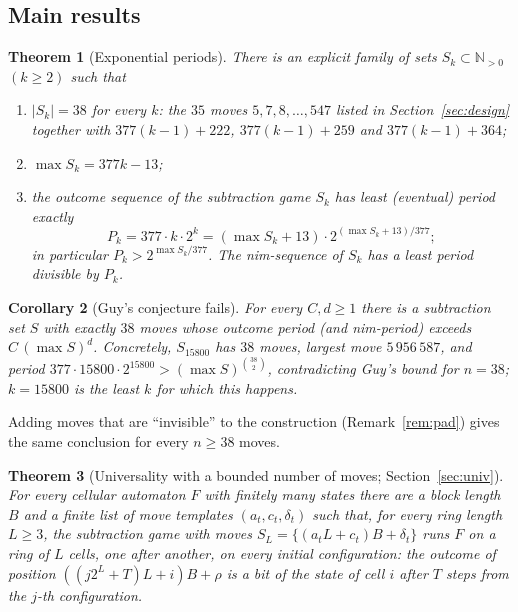\documentclass[11pt]{article}
\newtheorem{theorem}{Theorem}
\newtheorem{corollary}[theorem]{Corollary}
\theoremstyle{definition}
\newcommand{\N}{\mathbb{N}}
\newcommand{\nmoves}{38}
\begin{document}
\subsection{Main results}

\begin{theorem}[Exponential periods]\label{thm:main}
There is an explicit family of sets $S_k\subset\N_{>0}$ $(k\ge 2)$ such that
\begin{enumerate}[label=(\roman*)]
\item $|S_k|=\nmoves$ for every $k$: the $35$ moves $5,7,8,\dots,547$ listed in Section~\ref{sec:design}
together with $377(k-1)+222$, $377(k-1)+259$ and $377(k-1)+364$;
\item $\max S_k=377k-13$;
\item the outcome sequence of the subtraction game $S_k$ has least (eventual) period exactly
\[P_k=377\cdot k\cdot 2^{k}=(\max S_k+13)\cdot 2^{(\max S_k+13)/377};\]
in particular $P_k> 2^{\max S_k/377}$.  The nim-sequence of $S_k$ has a least period divisible by
$P_k$.
\end{enumerate}
\end{theorem}

\begin{corollary}[Guy's conjecture fails]\label{cor:guy}
For every $C,d\ge 1$ there is a subtraction set $S$ with exactly $\nmoves$ moves whose outcome period
(and nim-period) exceeds $C\,(\max S)^d$.  Concretely, $S_{15800}$ has $\nmoves$ moves, largest move
$5\,956\,587$, and period $377\cdot 15800\cdot 2^{15800}>(\max S)^{\binom{38}{2}}$, contradicting
Guy's bound for $n=\nmoves$; $k=15800$ is the least $k$ for which this happens.
\end{corollary}

Adding moves that are ``invisible'' to the construction (Remark~\ref{rem:pad}) gives the same
conclusion for every $n\ge\nmoves$ moves.

\begin{theorem}[Universality with a bounded number of moves; Section~\ref{sec:univ}]\label{thm:univintro}
For every cellular automaton $F$ with finitely many states there are a block length $B$ and a
finite list of move templates $(a_t,c_t,\delta_t)$ such that, for every ring length $L\ge3$, the
subtraction game with moves $S_L=\{(a_tL+c_t)B+\delta_t\}$ runs $F$ on a ring of $L$ cells, one after
another, on \emph{every} initial configuration: the outcome of position $((j2^L+T)L+i)B+\rho$ is a
bit of the state of cell $i$ after $T$ steps from the $j$-th configuration.
\end{theorem}
\end{document}
